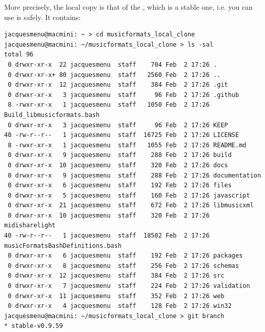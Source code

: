 More precisely, the local copy is that of the , which is a stable one, i.e. you can use is safely. It contains:
\begin{lstlisting}[language=Terminal]
jacquesmenu@macmini: ~ > cd musicformats_local_clone
jacquesmenu@macmini: ~/musicformats_local_clone > ls -sal
total 96
 0 drwxr-xr-x  22 jacquesmenu  staff    704 Feb  2 17:26 .
 0 drwxr-xr-x+ 80 jacquesmenu  staff   2560 Feb  2 17:26 ..
 0 drwxr-xr-x  12 jacquesmenu  staff    384 Feb  2 17:26 .git
 0 drwxr-xr-x   3 jacquesmenu  staff     96 Feb  2 17:26 .github
 8 -rwxr-xr-x   1 jacquesmenu  staff   1050 Feb  2 17:26 Build_libmusicformats.bash
 0 drwxr-xr-x   3 jacquesmenu  staff     96 Feb  2 17:26 KEEP
40 -rw-r--r--   1 jacquesmenu  staff  16725 Feb  2 17:26 LICENSE
 8 -rwxr-xr-x   1 jacquesmenu  staff   1055 Feb  2 17:26 README.md
 0 drwxr-xr-x   9 jacquesmenu  staff    288 Feb  2 17:26 build
 0 drwxr-xr-x  10 jacquesmenu  staff    320 Feb  2 17:26 docs
 0 drwxr-xr-x   9 jacquesmenu  staff    288 Feb  2 17:26 documentation
 0 drwxr-xr-x   6 jacquesmenu  staff    192 Feb  2 17:26 files
 0 drwxr-xr-x   5 jacquesmenu  staff    160 Feb  2 17:26 javascript
 0 drwxr-xr-x  21 jacquesmenu  staff    672 Feb  2 17:26 libmusicxml
 0 drwxr-xr-x  10 jacquesmenu  staff    320 Feb  2 17:26 midisharelight
40 -rw-r--r--   1 jacquesmenu  staff  18502 Feb  2 17:26 musicFormatsBashDefinitions.bash
 0 drwxr-xr-x   6 jacquesmenu  staff    192 Feb  2 17:26 packages
 0 drwxr-xr-x   8 jacquesmenu  staff    256 Feb  2 17:26 schemas
 0 drwxr-xr-x  12 jacquesmenu  staff    384 Feb  2 17:26 src
 0 drwxr-xr-x   7 jacquesmenu  staff    224 Feb  2 17:26 validation
 0 drwxr-xr-x  11 jacquesmenu  staff    352 Feb  2 17:26 web
 0 drwxr-xr-x   4 jacquesmenu  staff    128 Feb  2 17:26 win32
jacquesmenu@macmini: ~/musicformats_local_clone > git branch
* stable-v0.9.59
\end{lstlisting}


%
%


